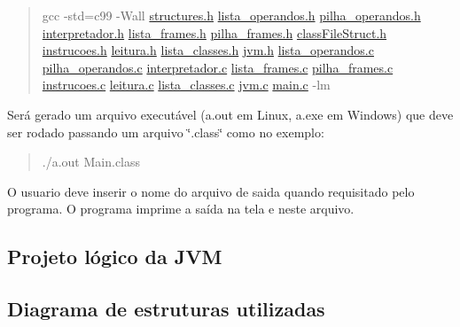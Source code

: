 \begin{quote}
gcc -\/std=c99 -\/\+Wall \hyperlink{structures_8h}{structures.\+h} \hyperlink{lista__operandos_8h}{lista\+\_\+operandos.\+h} \hyperlink{pilha__operandos_8h}{pilha\+\_\+operandos.\+h} \hyperlink{interpretador_8h}{interpretador.\+h} \hyperlink{lista__frames_8h}{lista\+\_\+frames.\+h} \hyperlink{pilha__frames_8h}{pilha\+\_\+frames.\+h} \hyperlink{classFileStruct_8h}{class\+File\+Struct.\+h} \hyperlink{instrucoes_8h}{instrucoes.\+h} \hyperlink{leitura_8h}{leitura.\+h} \hyperlink{lista__classes_8h}{lista\+\_\+classes.\+h} \hyperlink{jvm_8h}{jvm.\+h} \hyperlink{lista__operandos_8c}{lista\+\_\+operandos.\+c} \hyperlink{pilha__operandos_8c}{pilha\+\_\+operandos.\+c} \hyperlink{interpretador_8c}{interpretador.\+c} \hyperlink{lista__frames_8c}{lista\+\_\+frames.\+c} \hyperlink{pilha__frames_8c}{pilha\+\_\+frames.\+c} \hyperlink{instrucoes_8c}{instrucoes.\+c} \hyperlink{leitura_8c}{leitura.\+c} \hyperlink{lista__classes_8c}{lista\+\_\+classes.\+c} \hyperlink{jvm_8c}{jvm.\+c} \hyperlink{main_8c}{main.\+c} -\/lm \end{quote}


Será gerado um arquivo executável (a.\+out em Linux, a.\+exe em Windows) que deve ser rodado passando um arquivo \char`\"{}.\+class\char`\"{} como no exemplo\+:

\begin{quote}
./a.out Main.\+class \end{quote}


O usuario deve inserir o nome do arquivo de saida quando requisitado pelo programa. O programa imprime a saída na tela e neste arquivo.

\subsection*{Projeto lógico da J\+VM}



\subsection*{Diagrama de estruturas utilizadas}

 